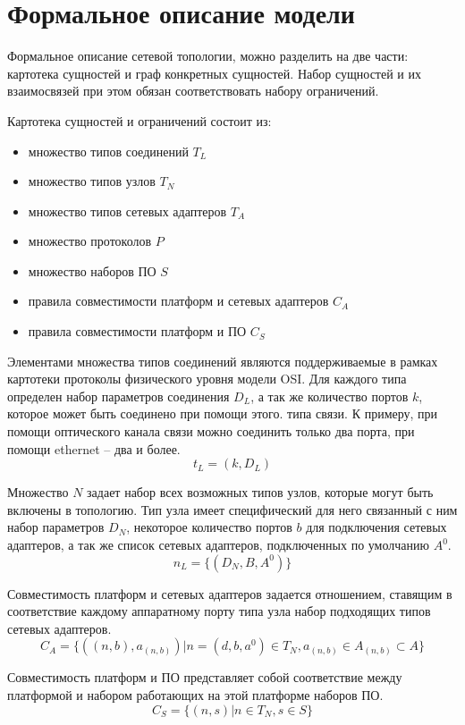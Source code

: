 \section{Формальное описание модели}

Формальное описание сетевой топологии, можно разделить на две части:
картотека сущностей и граф конкретных сущностей. 
Набор сущностей и их взаимосвязей при этом обязан соответствовать набору ограничений.

Картотека сущностей и ограничений состоит из:
\begin{itemize}
    \item множество типов соединений $T_L$
    \item множество типов узлов $T_N$
    \item множество типов сетевых адаптеров $T_A$
    \item множество протоколов $P$
    \item множество наборов ПО $S$
    \item правила совместимости платформ и сетевых адаптеров $C_A$
    \item правила совместимости платформ и ПО $C_S$
\end{itemize}

Элементами множества типов соединений являются поддерживаемые в рамках картотеки
протоколы физического уровня модели OSI. Для каждого типа определен набор параметров
соединения $D_L$, а так же количество портов $k$, которое может быть соединено при помощи этого.
типа связи. К примеру, при помощи оптического канала связи можно соединить только два порта,
при помощи ethernet -- два и более. 
$$ t_L = (k, D_L) $$ 

Множество $N$ задает набор всех возможных типов узлов, которые могут быть включены в 
топологию. Тип узла имеет специфический для него связанный с ним набор параметров $D_N$,
некоторое количество портов $b$ для подключения сетевых адаптеров, 
а так же список сетевых адаптеров, подключенных по умолчанию $A^0$.
$$ n_L = \{ (D_N, B, A^0) \} $$

Совместимость платформ и сетевых адаптеров задается отношением, ставящим в соответствие 
каждому аппаратному порту типа узла набор подходящих типов сетевых адаптеров.
$$ C_A = \{ ((n, b), a_{(n, b)}) | n = (d, b, a^0) \in T_N, a_{(n, b)} \in A_{(n, b)} \subset A \} $$

Совместимость платформ и ПО представляет собой соответствие между платформой и набором
работающих на этой платформе наборов ПО.
$$ C_S = \{ (n, s) | n \in T_N, s \in S \} $$

